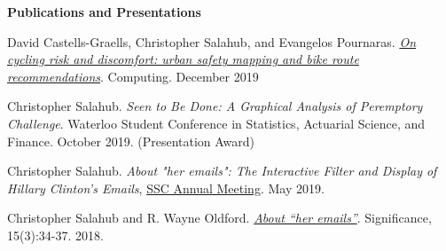 \documentclass[letterpaper,11pt]{article}
\newcommand{\resheading}[1]{\colorbox{resBlue}{\begin{minipage}{\textwidth}
			\textbf{#1}
\end{minipage}} \vspace{-14pt}}
\begin{document}
\begin{comment}
\resheading{Skills}
\begin{description}
	\item[Computer:] 
	{\footnotesize R, Python, MATLAB, Linux/UNIX, Emacs, Git, SQL, Microsoft Office, Bash, Shell Scripting} \vspace{-3pt}
	\item[Methods and Algorithms:] 
	{\footnotesize Dimension Reduction, Data Visualization, Machine Learning, Time Series, Experimental Design and Analysis, Sampling Methods, (Computational) Statistical Analysis, Statistical Learning, Text Analysis}
	{\footnotesize Regression (Logistic, GAM, Mixed Models), PCA, Factor Analysis, LDA, SVM, Simulated Annealing, MCMC, Boosting, Random Forests, SARIMA, GARCH, Graphical Models, Dimension Reduction, Model Regularization, Visualization, Experimental Design, Sampling Theory, Statistical Process Analysis, KNN, EM Algorithm, Text Processing} \vspace{-3pt}
	\item[Interpersonal:] 
	{\footnotesize Teamwork, Public Speaking, Leadership, Teaching, Writing, Time Management}
\end{description}
\end{comment}

\resheading{Publications and Presentations}
\begin{description}
	\item
	David Castells-Graells, Christopher Salahub, and Evangelos Pournaras. \href{https://link.springer.com/article/10.1007\%2Fs00607-019-00771-y}{\textit{On cycling risk and discomfort: urban safety mapping and bike route recommendations}}. Computing. December 2019
	\item 
	Christopher Salahub. \textit{Seen to Be Done: A Graphical Analysis of Peremptory Challenge}. Waterloo Student Conference in Statistics, Actuarial Science, and Finance. October 2019. (Presentation Award)
	\item
	Christopher Salahub. \textit{About "her emails": The Interactive Filter and Display of Hillary Clinton's Emails}, \href{https://ssc.ca/en/meeting/annual/program}{SSC Annual Meeting}. May 2019.
	\item
	Christopher Salahub and R. Wayne Oldford. \href{https://rss.onlinelibrary.wiley.com/doi/full/10.1111/j.1740-9713.2018.01148.x}{\textit{About ``her emails''}}. Significance, 15(3):34-37. 2018. 
\end{description}
\end{document}
